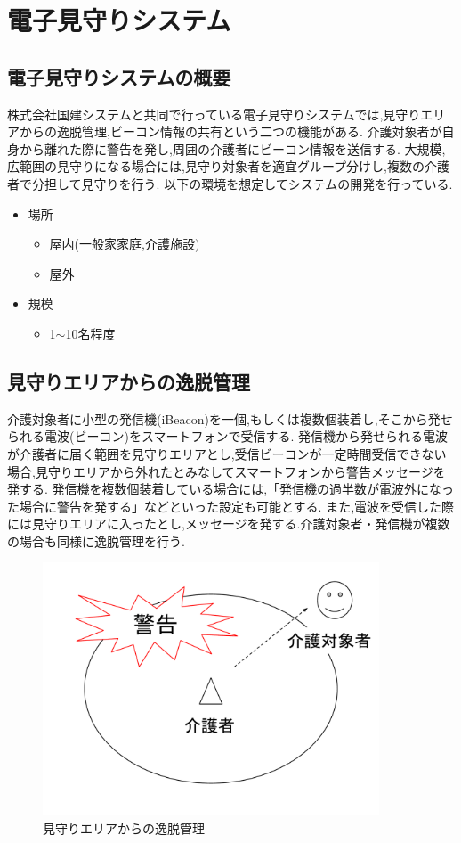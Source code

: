 \chapter{電子見守りシステム}
\label{chap:poordirection}

\section{電子見守りシステムの概要}
株式会社国建システムと共同で行っている電子見守りシステムでは,見守りエリアからの逸脱管理,ビーコン情報の共有という二つの機能がある.
介護対象者が自身から離れた際に警告を発し,周囲の介護者にビーコン情報を送信する.
大規模,広範囲の見守りになる場合には,見守り対象者を適宜グループ分けし,複数の介護者で分担して見守りを行う.
以下の環境を想定してシステムの開発を行っている.

\begin{itemize}
\item 場所
\begin{itemize}
\item 屋内(一般家家庭,介護施設)
\item 屋外
\end{itemize}
\item 規模
\begin{itemize}
\item 1$\sim$10名程度
\end{itemize}
\end{itemize}

\section{見守りエリアからの逸脱管理}
介護対象者に小型の発信機(iBeacon)を一個,もしくは複数個装着し,そこから発せられる電波(ビーコン)をスマートフォンで受信する.
発信機から発せられる電波が介護者に届く範囲を見守りエリアとし,受信ビーコンが一定時間受信できない場合,見守りエリアから外れたとみなしてスマートフォンから警告メッセージを発する.
発信機を複数個装着している場合には,「発信機の過半数が電波外になった場合に警告を発する」などといった設定も可能とする.
また,電波を受信した際には見守りエリアに入ったとし,メッセージを発する.介護対象者・発信機が複数の場合も同様に逸脱管理を行う.

\begin{figure}[htbp]
\centering
\includegraphics[width=10cm]{fig/deviation.pdf}
\caption{見守りエリアからの逸脱管理}
\end{figure}

